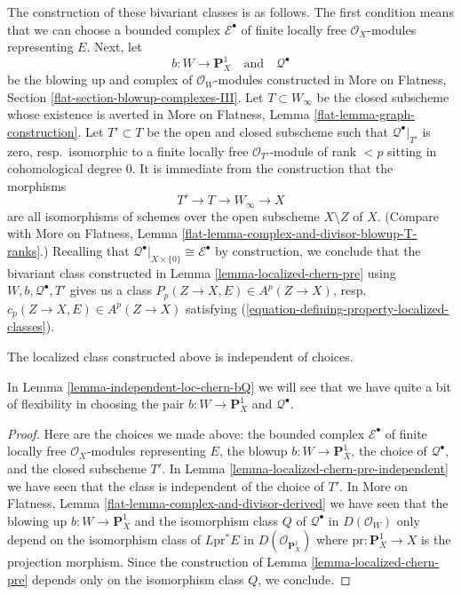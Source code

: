 \medskip\noindent
The construction of these bivariant classes is as follows. The first condition
means that we can choose a bounded complex $\mathcal{E}^\bullet$ of
finite locally free $\mathcal{O}_X$-modules representing $E$. Next, let
$$
b : W \longrightarrow \mathbf{P}^1_X
\quad\text{and}\quad
\mathcal{Q}^\bullet
$$
be the blowing up and complex of $\mathcal{O}_W$-modules constructed in
More on Flatness, Section \ref{flat-section-blowup-complexes-III}.
Let $T \subset W_\infty$ be the closed subscheme whose existence is
averted in More on Flatness, Lemma \ref{flat-lemma-graph-construction}.
Let $T' \subset T$ be the open and closed subscheme such that
$\mathcal{Q}^\bullet|_{T'}$ is zero, resp.\ isomorphic to a
finite locally free $\mathcal{O}_{T'}$-module of rank $< p$
sitting in cohomological degree $0$. It is immediate from the construction
that the morphisms
$$
T' \to T \to W_\infty \to X
$$
are all isomorphisms of schemes over the open subscheme $X \setminus Z$ of $X$.
(Compare with More on Flatness, Lemma
\ref{flat-lemma-complex-and-divisor-blowup-T-ranks}.)
Recalling that
$\mathcal{Q}^\bullet|_{X \times \{0\}} \cong \mathcal{E}^\bullet$
by construction, we conclude that the bivariant class constructed in
Lemma \ref{lemma-localized-chern-pre}
using $W, b, \mathcal{Q}^\bullet, T'$ gives us a class
$P_p(Z \to X, E) \in A^p(Z \to X)$, resp.\ $c_p(Z \to X, E) \in A^p(Z \to X)$
satisfying (\ref{equation-defining-property-localized-classes}).

\begin{lemma}
\label{lemma-independent-loc-chern}
The localized class constructed above is independent of choices.
\end{lemma}

\noindent
In Lemma \ref{lemma-independent-loc-chern-bQ} we will see that we
have quite a bit of flexibility in choosing the pair
$b : W \to \mathbf{P}^1_X$ and $\mathcal{Q}^\bullet$.

\begin{proof}
Here are the choices we made above: the bounded complex $\mathcal{E}^\bullet$ 
of finite locally free $\mathcal{O}_X$-modules representing $E$,
the blowup $b : W \to \mathbf{P}^1_X$, the choice of $\mathcal{Q}^\bullet$,
and the closed subscheme $T'$. In
Lemma \ref{lemma-localized-chern-pre-independent}
we have seen that the class is independent of the choice of $T'$. In
More on Flatness, Lemma \ref{flat-lemma-complex-and-divisor-derived}
we have seen that the blowing up $b : W \to \mathbf{P}^1_X$
and the isomorphism class $Q$ of $\mathcal{Q}^\bullet$ in $D(\mathcal{O}_W)$
only depend on the isomorphism class of $L\text{pr}^*E$ in
$D(\mathcal{O}_{\mathbf{P}^1_X})$ where $\text{pr} : \mathbf{P}^1_X \to X$
is the projection morphism. Since the construction of
Lemma \ref{lemma-localized-chern-pre} depends only on the
isomorphism class $Q$, we conclude.
\end{proof}

